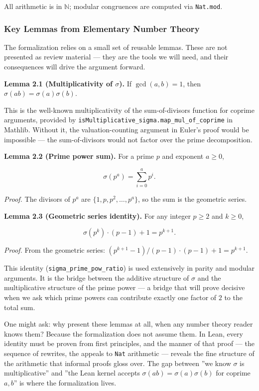 \documentclass[11pt,a4paper]{article}
\begin{document}
All arithmetic is in $\mathbb{N}$; modular congruences are computed via \texttt{Nat.mod}.

\subsubsection{Key Lemmas from Elementary Number Theory}

The formalization relies on a small set of reusable lemmas. These are not presented as review material --- they are the tools we will need, and their consequences will drive the argument forward.

\textbf{Lemma 2.1 (Multiplicativity of $\sigma$).} If $\gcd(a,b) = 1$, then $\sigma(ab) = \sigma(a) \sigma(b)$.

This is the well-known multiplicativity of the sum-of-divisors function for coprime arguments, provided by \texttt{isMultiplicative\_sigma.map\_mul\_of\_coprime} in Mathlib. Without it, the valuation-counting argument in Euler's proof would be impossible --- the sum-of-divisors would not factor over the prime decomposition.

\textbf{Lemma 2.2 (Prime power sum).} For a prime $p$ and exponent $a \ge 0$,

\[\sigma(p^a) = \sum_{i=0}^{a} p^i.\]

\emph{Proof.} The divisors of $p^a$ are $\{1,p,p^2,\ldots,p^a\}$, so the sum is the geometric series.

\textbf{Lemma 2.3 (Geometric series identity).} For any integer $p \ge 2$ and $k \ge 0$,

\[\sigma(p^k) \cdot (p-1) + 1 = p^{k+1}.\]

\emph{Proof.} From the geometric series: $(p^{k+1} - 1)/(p-1) \cdot (p-1) + 1 = p^{k+1}$.

This identity (\texttt{sigma\_prime\_pow\_ratio}) is used extensively in parity and modular arguments. It is the bridge between the additive structure of $\sigma$ and the multiplicative structure of the prime power --- a bridge that will prove decisive when we ask which prime powers can contribute exactly one factor of $2$ to the total sum.

One might ask: why present these lemmas at all, when any number theory reader knows them? Because the formalization does not assume them. In Lean, every identity must be proven from first principles, and the manner of that proof --- the sequence of rewrites, the appeals to \texttt{Nat} arithmetic --- reveals the fine structure of the arithmetic that informal proofs gloss over. The gap between ''we know $\sigma$ is multiplicative'' and ''the Lean kernel accepts $\sigma(ab) = \sigma(a)\sigma(b)$ for coprime $a,b$'' is where the formalization lives.
\end{document}
